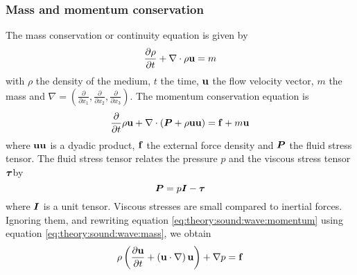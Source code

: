 \subsubsection*{Mass and momentum conservation}
The mass conservation or continuity equation is given by
\begin{equation}\label{eq:theory:sound:wave:mass}
 \frac{\partial \rho}{\partial t} + \nabla \cdot \rho \mathbf{u} = m
\end{equation}
with $\rho$ the density of the medium, $t$ the time, $\mathbf{u}$ the flow velocity
vector, $m$ the mass and $\nabla = \left( \frac{\partial}{\partial
x_1},\frac{\partial}{\partial x_2},\frac{\partial}{\partial x_3} \right)$.
The momentum conservation equation is
\begin{equation}\label{eq:theory:sound:wave:momentum}
 \frac{\partial}{\partial t} \rho \mathbf{u} + \nabla \cdot \left(\bm{P} + \rho \mathbf{u} \mathbf{u}  \right) = \mathbf{f} + m \mathbf{u}
\end{equation}
where $\mathbf{u} \mathbf{u}$ is a dyadic product, $\mathbf{f}$ the external force
density and $\bm{P}$ the fluid stress tensor. The fluid stress tensor relates the pressure $p$ and the viscous stress tensor $\bm{\tau}$by
\begin{equation}
  \bm{P} = p \bm{I} - \bm{\tau}
\end{equation}
where $\bm{I}$ is a unit tensor. Viscous stresses are small compared to inertial
forces. Ignoring them, and rewriting equation
\ref{eq:theory:sound:wave:momentum} using equation
\ref{eq:theory:sound:wave:mass}, we obtain
\begin{equation}
 \rho \left( \frac{\partial \mathbf{u}}{\partial t} + \left( \mathbf{u} \cdot \nabla \right) \mathbf{u} \right) + \nabla p = \mathbf{f}
\end{equation}
